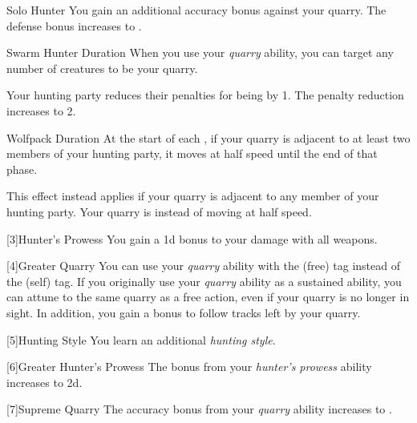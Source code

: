 {\begin{durationability}{Solo Hunter}
                \rankline
                 You gain an additional  accuracy bonus against your quarry.
                 The defense bonus increases to .
            \end{durationability}

            \begin{durationability}{Swarm Hunter}
                Duration
                \rankline
                When you use your \textit{quarry} ability, you can target any number of creatures to be your quarry.

                \rankline
                 Your hunting party reduces their penalties for being \surrounded by 1.
                 The penalty reduction increases to 2.
            \end{durationability}

            \begin{durationability}{Wolfpack}
                Duration
                \rankline
                At the start of each , if your quarry is adjacent to at least two members of your hunting party, it moves at half speed until the end of that phase.

                \rankline
                 This effect instead applies if your quarry is adjacent to any member of your hunting party.
                 Your quarry is \slowed instead of moving at half speed.
            \end{durationability}
        }

        [3]{Hunter's Prowess} You gain a \plus1d bonus to your damage with all weapons.

        [4]{Greater Quarry} You can use your \textit{quarry} ability with the  (free) tag instead of the  (self) tag.
        If you originally use your \textit{quarry} ability as a sustained ability, you can attune to the same quarry as a free action, even if your quarry is no longer in sight.
        In addition, you gain a  bonus to follow tracks left by your quarry.

        [5]{Hunting Style}
        You learn an additional \textit{hunting style}.

        [6]{Greater Hunter's Prowess} The bonus from your \textit{hunter's prowess} ability increases to \plus2d.

        [7]{Supreme Quarry} The accuracy bonus from your \textit{quarry} ability increases to .

